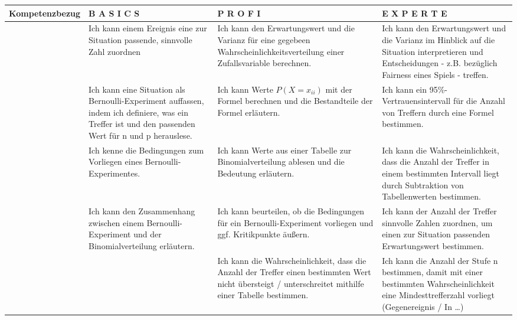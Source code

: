 \documentclass[11pt,twocolumn,oneside,openany,headings=optiontotoc,11pt,numbers=noenddot]{article}
\begin{document}
	\begin{landscape}
		\renewcommand{\arraystretch}{1.5}
		\begin{tabularx}{45\baselineskip}{|M|X|X|X|}
			\hline
			 \textbf{Kompetenzbezug} & \textbf{B A S I C S} & \textbf{P R O F I} & \textbf{E X P E R T E}\\
			\hline
			 & Ich kann einem Ereignis eine zur Situation passende, sinnvolle Zahl zuordnen & Ich kann den Erwartungswert und die Varianz für eine gegebeen Wahrscheinlichkeitsverteilung einer Zufallsvariable berechnen. & Ich kann den Erwartungswert und die Varianz im Hinblick auf die Situation interpretieren und Entscheidungen - z.B. bezüglich Fairness eines Spiels - treffen.\\
			\hline
			 & Ich kann eine Situation als Bernoulli-Experiment auffassen, indem ich definiere, was ein Treffer ist und den passenden Wert für n und p herauslese. & Ich kann Werte \(P(X=x_{ii})\) mit der Formel berechnen und die Bestandteile der Formel erläutern. & Ich kann ein 95\%-Vertrauensintervall für die Anzahl von Treffern durch eine Formel bestimmen.\\
			& Ich kenne die Bedingungen zum Vorliegen eines Bernoulli-Experimentes. & Ich kann Werte aus einer Tabelle zur Binomialverteilung ablesen und die Bedeutung erläutern. & Ich kann die Wahrscheinlichkeit, dass die Anzahl der Treffer in einem bestimmten Intervall liegt durch Subtraktion von Tabellenwerten bestimmen.\\
			& Ich kann den Zusammenhang zwischen einem Bernoulli-Experiment und der Binomialverteilung erläutern. & Ich kann beurteilen, ob die Bedingungen für ein Bernoulli-Experiment vorliegen und ggf. Kritikpunkte äußern. & Ich kann der Anzahl der Treffer sinnvolle Zahlen zuordnen, um einen zur Situation passenden Erwartungswert bestimmen.\\
			& & Ich kann die Wahrscheinlichkeit, dass die Anzahl der Treffer einen bestimmten Wert nicht übersteigt / unterschreitet mithilfe einer Tabelle bestimmen. & Ich kann die Anzahl der Stufe \glqq{}n\grqq{} bestimmen, damit mit einer bestimmten Wahrscheinlichkeit eine Mindesttrefferzahl vorliegt (Gegenereignis / In \ldots)\\
			\hline
		\end{tabularx}
	\end{landscape}
\end{document}
